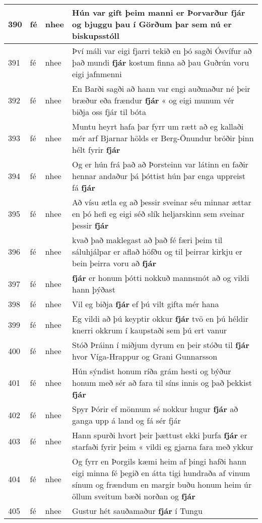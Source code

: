 \documentclass{article}
\begin{document}
\begin{longtable}{p{1cm}|p{1cm}|p{1cm}|p{13cm}}
\hline
390&fé&nhee&Hún var gift þeim manni er Þorvarður \textbf{fjár} og bjuggu þau í Görðum þar sem nú er biskupsstóll\\
\hline
391&fé&nhee&Því máli var eigi fjarri tekið en þó sagði Ósvífur að það mundi \textbf{fjár} kostum finna að þau Guðrún voru eigi jafnmenni\\
\hline
392&fé&nhee&En Barði sagði að hann var engi auðmaður né þeir bræður eða frændur \textbf{fjár} « og eigi munum vér biðja oss fjár til bóta\\
\hline
393&fé&nhee&Muntu heyrt hafa þar fyrr um rætt að eg kallaði mér arf Bjarnar hölds er Berg-Önundur bróðir þinn hélt fyrir \textbf{fjár} \\
\hline
394&fé&nhee&Og er hún frá það að Þorsteinn var látinn en faðir hennar andaður þá þóttist hún þar enga uppreist fá \textbf{fjár} \\
\hline
395&fé&nhee&Að vísu ætla eg að þessir sveinar séu minnar ættar en þó hefi eg eigi séð slík heljarskinn sem sveinar þessir \textbf{fjár} \\
\hline
396&fé&nhee&kvað það maklegast að það fé færi þeim til sáluhjálpar er aflað höfðu og til þeirrar kirkju er bein þeirra voru að \textbf{fjár} \\
\hline
397&fé&nhee& \textbf{fjár} er honum þótti nokkuð mannsmót að og vildi hann þýðast\\
\hline
398&fé&nhee&Vil eg biðja \textbf{fjár} ef þú vilt gifta mér hana\\
\hline
399&fé&nhee&Eg vildi að þú keyptir okkur \textbf{fjár} tvö en þú héldir knerri okkrum í kaupstaði sem þú ert vanur\\
\hline
400&fé&nhee&Stóð Þráinn í miðjum dyrum en þeir stóðu til \textbf{fjár} hvor Víga-Hrappur og Grani Gunnarsson\\
\hline
401&fé&nhee&Hún sýndist honum ríða grám hesti og býður honum með sér að fara til síns innis og það þekkist \textbf{fjár} \\
\hline
402&fé&nhee&Spyr Þórir ef mönnum sé nokkur hugur \textbf{fjár} að ganga upp á land og fá sér fjár\\
\hline
403&fé&nhee&Hann spurði hvort þeir þættust ekki þurfa \textbf{fjár} er starfaði fyrir þeim « vildi eg gjarna fara með ykkur\\
\hline
404&fé&nhee&Og fyrr en Þorgils kæmi heim af þingi hafði hann eigi minna fé þegið en átta tigi hundraða af vinum sínum og frændum en margir buðu honum heim úr öllum sveitum bæði norðan og \textbf{fjár} \\
\hline
405&fé&nhee&Gustur hét sauðamaður \textbf{fjár} í Tungu\\

\end{longtable}
\end{document}
